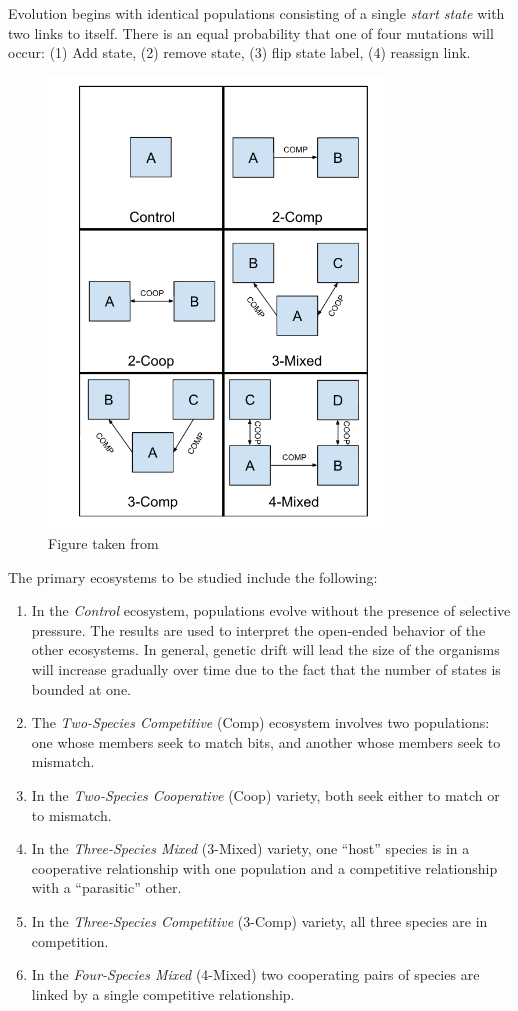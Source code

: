 \documentclass{article}
\begin{document}
Evolution begins with identical populations consisting of a single \textit{start state} with two 
links to itself. There is an equal probability that one of 
four mutations will occur: (1) Add state, (2) remove state, (3) flip state label, (4) reassign link.

\begin{figure}[H]
    \begin{center}
        \includegraphics[width=3.5in]{ecosystems.png}
        \caption{Figure taken from \cite{moran2019evolving}}
        \label{ecosystems}
    \end{center}
\end{figure}

The primary ecosystems to be studied include the following:
\begin{enumerate}
    \item In the \textit{Control} ecosystem, populations evolve without the presence of selective pressure.
        The results are used to interpret the open-ended behavior of the other ecosystems.
        In general, genetic drift will lead the size of the organisms will increase gradually 
        over time due to the fact that the number of states is bounded at one.
    \item The \textit{Two-Species Competitive} (Comp) ecosystem involves two populations: one 
        whose members seek to match bits, and another whose members seek to mismatch.
    \item In the \textit{Two-Species Cooperative} (Coop) variety, both seek either to match or 
        to mismatch. 
    \item In the \textit{Three-Species Mixed} (3-Mixed) variety, one ``host'' species is in a 
        cooperative relationship with one population and a competitive relationship with a ``parasitic'' other. 
    \item In the \textit{Three-Species Competitive} (3-Comp) variety, all three species are in competition.
    \item In the \textit{Four-Species Mixed} (4-Mixed) two cooperating pairs of species are linked by 
        a single competitive relationship.
\end{enumerate}
\end{document}
